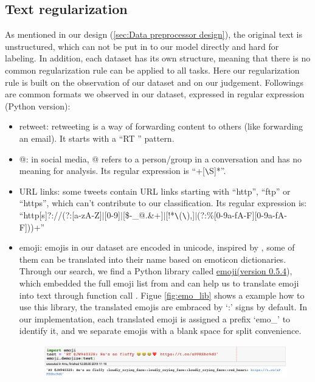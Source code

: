 \subsection{Text regularization}
As mentioned in our design (\ref{sec:Data preprocessor design}), the original text is unstructured, which can not be put in to our model directly and hard for labeling. In addition, each dataset has its own structure, meaning that there is no common regularization rule can be applied to all tasks. Here our regularization rule is built on the observation of our dataset and on our judgement. Followings are common formats we observed in our dataset, expressed in regular expression (Python version):
    \begin{itemize}
        \item retweet: retweeting is a way of forwarding content to others (like forwarding an email). It starts with a ``RT \@'' pattern. 
        \item @: in social media, @ refers to a person/group in a conversation and has no meaning for analysis. Its regular expression is ``\@+[\verb|\|S]*''. 
        \item URL links: some tweets contain URL links starting with ``http'', ``ftp'' or ``https'', which can't contribute to our classification. Its regular expression is:\\``http[s]?://(?:[a-zA-Z]$|$[0-9]$|$[\$-\_@.\&+]$|$[!*\verb|\|(\verb|\|),]$|$(?:\%[0-9a-fA-F][0-9a-fA-F]))+''
        \item emoji: emojis in our dataset are encoded in unicode, inspired by \cite{serban2019real}, some of them can be translated into their name based on emoticon dictionaries. Through our search, we find a Python library called \href{https://pypi.org/project/emoji/} {emoji(version 0.5.4}), which embedded the full emoji list from \cite{emo_list} and can help us to translate emoji into text through function call \cite{pytho_emo}. Figue \ref{fig:emo_lib} shows a example how to use this library, the translated emojis are embraced by `:' signs by default. In our implementation, each translated emoji is assigned a prefix `emo\_' to identify it, and we separate emojis with a blank space for split convenience.
        \begin{figure}[!htbp]
            \centering
            \includegraphics[width=5in]{images/emoji_lib.png}

\end{figure}
\end{itemize}
